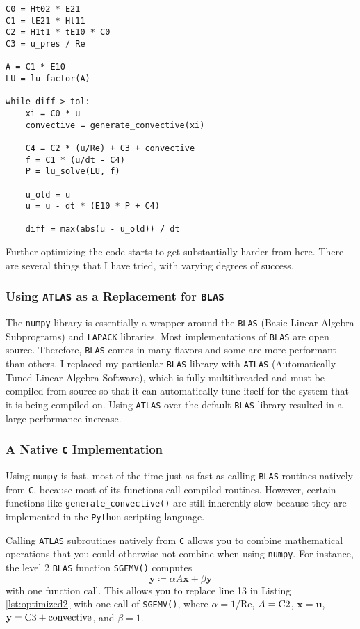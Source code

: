 \begin{lstlisting}[caption=Code excerpt after moving the factorization stage., label=lst:optimized2]
C0 = Ht02 * E21
C1 = tE21 * Ht11
C2 = H1t1 * tE10 * C0
C3 = u_pres / Re

A = C1 * E10
LU = lu_factor(A)

while diff > tol:
    xi = C0 * u
    convective = generate_convective(xi)
    
    C4 = C2 * (u/Re) + C3 + convective
    f = C1 * (u/dt - C4)
    P = lu_solve(LU, f)
    
    u_old = u
    u = u - dt * (E10 * P + C4)
    
    diff = max(abs(u - u_old)) / dt
\end{lstlisting}

Further optimizing the code starts to get substantially harder from here. There are several things that I have tried, with varying degrees of success.

\subsubsection{Using \texttt{ATLAS} as a Replacement for \texttt{BLAS}}

The \texttt{numpy} library is essentially a wrapper around the \texttt{BLAS} (Basic Linear Algebra Subprograms) and \texttt{LAPACK} libraries. Most implementations of \texttt{BLAS} are open source. Therefore, \texttt{BLAS} comes in many flavors and some are more performant than others. I replaced my particular \texttt{BLAS} library with \texttt{ATLAS} (Automatically Tuned Linear Algebra Software), which is fully multithreaded and must be compiled from source so that it can automatically tune itself for the system that it is being compiled on. Using \texttt{ATLAS} over the default \texttt{BLAS} library resulted in a large performance increase.

\subsubsection{A Native \texttt{C} Implementation}

Using \texttt{numpy} is fast, most of the time just as fast as calling \texttt{BLAS} routines natively from \texttt{C}, because most of its functions call compiled routines. However, certain functions like \lstinline|generate_convective()| are still inherently slow because they are implemented in the \texttt{Python} scripting language. 
 
Calling \texttt{ATLAS} subroutines natively from \texttt{C} allows you to combine mathematical operations that you could otherwise not combine when using \texttt{numpy}. For instance, the level 2 \texttt{BLAS} function \texttt{SGEMV()} computes
\begin{equation}
    \mathbf{y} \coloneqq \alpha A \mathbf{x} + \beta \mathbf{y}
\end{equation}
with one function call. This allows you to replace line 13 in Listing \ref{lst:optimized2} with one call of \texttt{SGEMV()}, where $\alpha = 1 / \text{Re}$, $A = \text{\lstinline|C2|}$, $\mathbf{x} = \mathbf{u}$, $\mathbf{y} = \text{\lstinline|C3|} + \text{convective}$, and $\beta = 1$.
        
